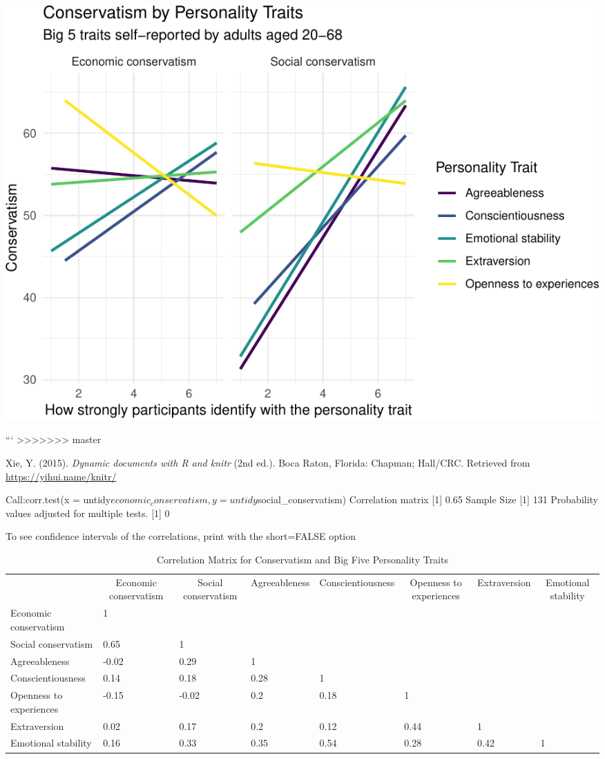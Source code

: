 \documentclass[man]{apa6}
\makeatletter
\newenvironment{lltable}{\begin{landscape}\begin{center}\begin{ThreePartTable}}{\end{ThreePartTable}\end{center}\end{landscape}}
\newcommand\LastLTentrywidth{1em}
\newlength\longtablewidth
\newcommand{\getlongtablewidth}{\begingroup \ifcsname LT@\roman{LT@tables}\endcsname \global\longtablewidth=0pt \renewcommand{\LT@entry}[2]{\global\advance\longtablewidth by ##2\relax\gdef\LastLTentrywidth{##2}}\@nameuse{LT@\roman{LT@tables}} \fi \endgroup}
\makeatother
\begin{document}
\includegraphics{manuscript_files/figure-latex/figure2-1.pdf}

```
>>>>>>> master

\hypertarget{ref-R-knitr}{}
Xie, Y. (2015). \emph{Dynamic documents with R and knitr} (2nd ed.).
Boca Raton, Florida: Chapman; Hall/CRC. Retrieved from
\url{https://yihui.name/knitr/}

Call:corr.test(x =
untidy\(economic_conservatism, y = untidy\)social\_conservatism)
Correlation matrix {[}1{]} 0.65 Sample Size {[}1{]} 131 Probability
values adjusted for multiple tests. {[}1{]} 0

To see confidence intervals of the correlations, print with the
short=FALSE option

\begin{lltable}


\tiny{
\begin{longtable}{llllllll}\noalign{\getlongtablewidth\global\LTcapwidth=\longtablewidth}
\caption{\label{tab:correlations}Correlation Matrix for Conservatism and Big Five Personality Traits}\\
\toprule
 & \multicolumn{1}{c}{Economic conservatism} & \multicolumn{1}{c}{Social conservatism} & \multicolumn{1}{c}{Agreeableness} & \multicolumn{1}{c}{Conscientiousness} & \multicolumn{1}{c}{Openness to experiences} & \multicolumn{1}{c}{Extraversion} & \multicolumn{1}{c}{Emotional stability}\\
\midrule
Economic conservatism & 1 &  &  &  &  &  & \\
Social conservatism & 0.65 & 1 &  &  &  &  & \\
Agreeableness & -0.02 & 0.29 & 1 &  &  &  & \\
Conscientiousness & 0.14 & 0.18 & 0.28 & 1 &  &  & \\
Openness to experiences & -0.15 & -0.02 & 0.2 & 0.18 & 1 &  & \\
Extraversion & 0.02 & 0.17 & 0.2 & 0.12 & 0.44 & 1 & \\
Emotional stability & 0.16 & 0.33 & 0.35 & 0.54 & 0.28 & 0.42 & 1\\
\bottomrule
\end{longtable}
}
\end{lltable}
\end{document}
